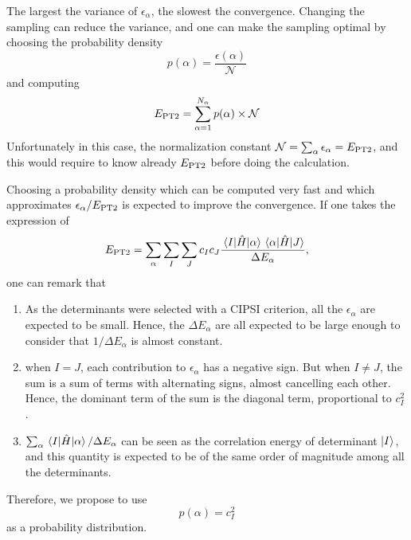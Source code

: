 \documentclass[./thesis.tex]{subfiles}
\begin{document}
The largest the variance of $\epsilon_\alpha$, the slowest the convergence. Changing the sampling can reduce the variance, and one can make the sampling optimal by choosing the probability density
\begin{equation}
p(\alpha) = \frac{\epsilon(\alpha)}{\mathcal{N}}
\end{equation}
and computing
\begin{equation}
E_\text{PT2} = \sum_{\alpha = 1}^{N_\alpha} p(\alpha) \times \mathcal{N}
\end{equation}
Unfortunately in this case, the normalization constant $\mathcal{N} =
\sum_\alpha \epsilon_\alpha = E_\text{PT2}$, and this would require to know already
$E_\text{PT2}$ before doing the calculation.

Choosing a probability density which can be computed very fast and which
approximates $\epsilon_\alpha / E_\text{PT2}$ is expected to improve the convergence.
If one takes the expression of 
\begin{equation}
E_\text{PT2} = \sum_\alpha \sum_I \sum_J c_I c_J \frac{\mel{I}{\hat{H}}{\alpha} \mel{\alpha}{\hat{H}}{J}}{\Delta E_\alpha}, 
\end{equation}
one can remark that
\begin{enumerate}
\item As the determinants were selected with a CIPSI criterion, all the $\epsilon_\alpha$ are expected to be small. Hence, the $\Delta E_\alpha$ are all expected to be large enough to consider that $1/\Delta E_\alpha$ is almost constant.
\item 
when $I=J$, each contribution to $\epsilon_\alpha$ has a negative sign. But when $I \ne J$, the sum is a sum of terms with alternating signs, almost cancelling each other. Hence, the dominant term of the sum is the diagonal term, proportional to $c_I^2$.
\item $\sum_\alpha \mel{I}{\hat{H}}{\alpha} / \Delta E_\alpha$ can be seen as the correlation
energy of determinant ${\ket{I}}$, and this quantity is expected to be of the same order of magnitude among all the determinants.
\end{enumerate}
Therefore, we propose to use 
\begin{equation}
p(\alpha) = {c_I^2}
\end{equation}
as a probability distribution. 
\end{document}
